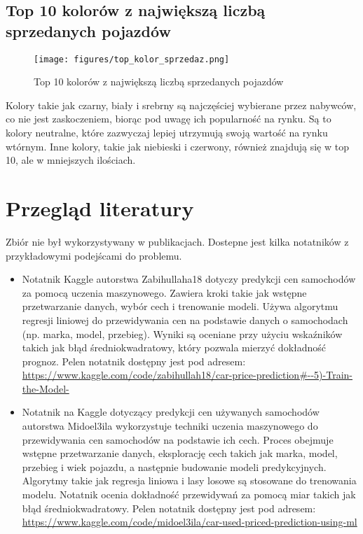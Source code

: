 \documentclass[10pt,letterpaper]{article}
\begin{document}
\subsection{Top 10 kolorów z największą liczbą sprzedanych pojazdów}
\begin{figure}[H]
\begin{center}
   \texttt{[image: figures/top\_kolor\_sprzedaz.png]}
   \caption{Top 10 kolorów z największą liczbą sprzedanych pojazdów}
   \label{fig:other-figure-log}
\end{center}
\end{figure}
Kolory takie jak czarny, biały i srebrny są najczęściej wybierane przez nabywców, co nie jest zaskoczeniem, biorąc pod uwagę ich popularność na rynku. Są to kolory neutralne, które zazwyczaj lepiej utrzymują swoją wartość na rynku wtórnym. Inne kolory, takie jak niebieski i czerwony, również znajdują się w top 10, ale w mniejszych ilościach.

\section{Przegląd literatury}
Zbiór nie był wykorzystywany w publikacjach. Dostepne jest kilka notatników z przykładowymi podejścami do problemu. 
\begin{itemize}
    \item Notatnik Kaggle autorstwa Zabihullaha18 dotyczy predykcji cen samochodów za pomocą uczenia maszynowego. Zawiera kroki takie jak wstępne przetwarzanie danych, wybór cech i trenowanie modeli. Używa algorytmu regresji liniowej do przewidywania cen na podstawie danych o samochodach (np. marka, model, przebieg). Wyniki są oceniane przy użyciu wskaźników takich jak błąd średniokwadratowy, który pozwala mierzyć dokładność prognoz. Pelen notatnik dostępny jest pod adresem: \url{https://www.kaggle.com/code/zabihullah18/car-price-prediction#--5)-Train-the-Model-}
    \item Notatnik na Kaggle dotyczący predykcji cen używanych samochodów autorstwa Midoel3ila wykorzystuje techniki uczenia maszynowego do przewidywania cen samochodów na podstawie ich cech. Proces obejmuje wstępne przetwarzanie danych, eksplorację cech takich jak marka, model, przebieg i wiek pojazdu, a następnie budowanie modeli predykcyjnych. Algorytmy takie jak regresja liniowa i lasy losowe są stosowane do trenowania modelu. Notatnik ocenia dokładność przewidywań za pomocą miar takich jak błąd średniokwadratowy. Pelen notatnik dostępny jest pod adresem: \url{https://www.kaggle.com/code/midoel3ila/car-used-priced-prediction-using-ml}  
\end{itemize}
\end{document}

